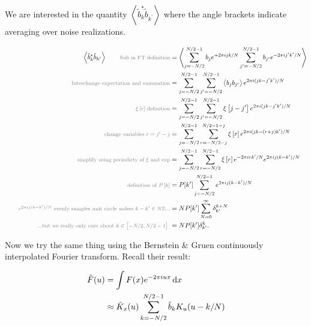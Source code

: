\documentclass{article}
\newcommand*{\annot}[1]{\tag*{\footnotesize{\textcolor{gray}{#1}}}}
\begin{document}
%

We are interested in the quantity $\left\langle\tilde{b}^*_k \tilde{b}_{k^\prime}\right\rangle$
where the angle brackets indicate averaging over noise realizations.

\begin{align}
    \left\langle\tilde{b}^*_k \tilde{b}_{k^\prime}\right\rangle
    \annot{Sub in FT definition}
    &= \left\langle\sum_{j=-N/2}^{N/2-1} b_j e^{+2 \pi i j k / N} \sum_{j^\prime=-N/2}^{N/2-1} b_{j^\prime} e^{-2 \pi i j^\prime k^\prime / N}\right\rangle \\
    \annot{Interchange expectation and summation}
    &= \sum_{j=-N/2}^{N/2-1} \sum_{j^\prime=-N/2}^{N/2-1} \left\langle b_j b_{j^\prime} \right\rangle e^{2 \pi i (jk - j^\prime k^\prime)/N} \\
    \annot{$\xi\left[r\right]$ definition}
    &= \sum_{j=-N/2}^{N/2-1} \sum_{j^\prime=-N/2}^{N/2-1} \xi\left[j-j^\prime\right] e^{2 \pi i (jk - j^\prime k^\prime)/N} \\
    \annot{change variables $r=j^\prime-j$}
    &= \sum_{j=-N/2}^{N/2-1} \sum_{r=-N/2-j}^{N/2-1-j} \xi\left[r\right] e^{2 \pi i (jk - (r+j) k^\prime)/N} \\
    \annot{simplify using periodicty of $\xi$ and $\exp$}
    &= \sum_{j=-N/2}^{N/2-1} \sum_{r=-N/2}^{N/2-1} \xi\left[r\right] e^{-2 \pi i r k^\prime/N} e^{2 \pi i j (k-k^\prime)/N} \\
    \annot{definition of $P\left[k\right]$}
    &= P[k^\prime] \sum_{j=-N/2}^{N/2-1} e^{2 \pi i j (k-k^\prime)/N} \\
    \annot{$e^{2 \pi i j (k-k^\prime)/N}$ evenly samples unit circle unless $k-k^\prime \in N\mathbb{Z}$...}
    &= N P[k^\prime] \sum_{N=0}^\infty\delta^{k+N}_{k^\prime} \\
    \annot{...but we really only care about $k \in \left[-N/2, N/2-1 \right]$ }
    &= N P[k^\prime] \delta^{k}_{k^\prime}.
\end{align}

Now we try the same thing using the Bernstein \& Gruen continuously interpolated Fourier transform.
Recall their result:

\begin{align}
    \tilde{F}(u)
    &= \int{F(x) e^{-2 \pi i u x} \dif{x}} \\
    &\approx \tilde{K}_x(u) \sum_{k=-N/2}^{N/2-1}\tilde{b}_k K_u(u-k/N)
\end{align}
\end{document}
